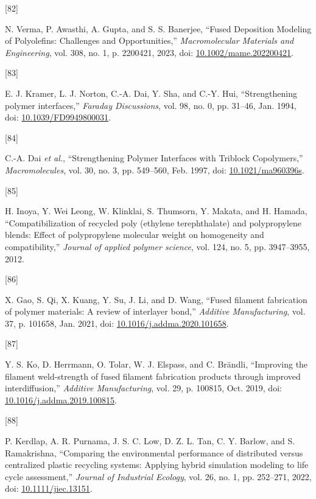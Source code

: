 \documentclass[
]{article}
\newlength{\cslhangindent}
\newlength{\csllabelwidth}
\newlength{\cslentryspacingunit} %
\newenvironment{CSLReferences}[2] %
 {%
  \setlength{\parindent}{0pt}
  \ifodd #1
  \let\oldpar\par
  \def\par{\hangindent=\cslhangindent\oldpar}
  \fi
  \setlength{\parskip}{#2\cslentryspacingunit}
 }%
 {}
\newcommand{\CSLLeftMargin}[1]{\parbox[t]{\csllabelwidth}{#1}}
\newcommand{\CSLRightInline}[1]{\parbox[t]{\linewidth - \csllabelwidth}{#1}\break}
\begin{document}
\begin{CSLReferences}{0}{0}
\leavevmode{}%
\CSLLeftMargin{{[}82{]} }%
\CSLRightInline{N. Verma, P. Awasthi, A. Gupta, and S. S. Banerjee,
{``Fused {Deposition Modeling} of {Polyolefins}: {Challenges} and
{Opportunities},''} \emph{Macromolecular Materials and Engineering},
vol. 308, no. 1, p. 2200421, 2023, doi:
\href{https://doi.org/10.1002/mame.202200421}{10.1002/mame.202200421}.}

\leavevmode{}%
\CSLLeftMargin{{[}83{]} }%
\CSLRightInline{E. J. Kramer, L. J. Norton, C.-A. Dai, Y. Sha, and C.-Y.
Hui, {``Strengthening polymer interfaces,''} \emph{Faraday Discussions},
vol. 98, no. 0, pp. 31--46, Jan. 1994, doi:
\href{https://doi.org/10.1039/FD9949800031}{10.1039/FD9949800031}.}

\leavevmode{}%
\CSLLeftMargin{{[}84{]} }%
\CSLRightInline{C.-A. Dai \emph{et al.}, {``Strengthening {Polymer
Interfaces} with {Triblock Copolymers},''} \emph{Macromolecules}, vol.
30, no. 3, pp. 549--560, Feb. 1997, doi:
\href{https://doi.org/10.1021/ma960396s}{10.1021/ma960396s}.}

\leavevmode{}%
\CSLLeftMargin{{[}85{]} }%
\CSLRightInline{H. Inoya, Y. Wei Leong, W. Klinklai, S. Thumsorn, Y.
Makata, and H. Hamada, {``Compatibilization of recycled poly (ethylene
terephthalate) and polypropylene blends: Effect of polypropylene
molecular weight on homogeneity and compatibility,''} \emph{Journal of
applied polymer science}, vol. 124, no. 5, pp. 3947--3955, 2012.}

\leavevmode{}%
\CSLLeftMargin{{[}86{]} }%
\CSLRightInline{X. Gao, S. Qi, X. Kuang, Y. Su, J. Li, and D. Wang,
{``Fused filament fabrication of polymer materials: {A} review of
interlayer bond,''} \emph{Additive Manufacturing}, vol. 37, p. 101658,
Jan. 2021, doi:
\href{https://doi.org/10.1016/j.addma.2020.101658}{10.1016/j.addma.2020.101658}.}

\leavevmode{}%
\CSLLeftMargin{{[}87{]} }%
\CSLRightInline{Y. S. Ko, D. Herrmann, O. Tolar, W. J. Elspass, and C.
Brändli, {``Improving the filament weld-strength of fused filament
fabrication products through improved interdiffusion,''} \emph{Additive
Manufacturing}, vol. 29, p. 100815, Oct. 2019, doi:
\href{https://doi.org/10.1016/j.addma.2019.100815}{10.1016/j.addma.2019.100815}.}

\leavevmode{}%
\CSLLeftMargin{{[}88{]} }%
\CSLRightInline{P. Kerdlap, A. R. Purnama, J. S. C. Low, D. Z. L. Tan,
C. Y. Barlow, and S. Ramakrishna, {``Comparing the environmental
performance of distributed versus centralized plastic recycling systems:
{Applying} hybrid simulation modeling to life cycle assessment,''}
\emph{Journal of Industrial Ecology}, vol. 26, no. 1, pp. 252--271,
2022, doi:
\href{https://doi.org/10.1111/jiec.13151}{10.1111/jiec.13151}.}


\end{CSLReferences}
\end{document}
